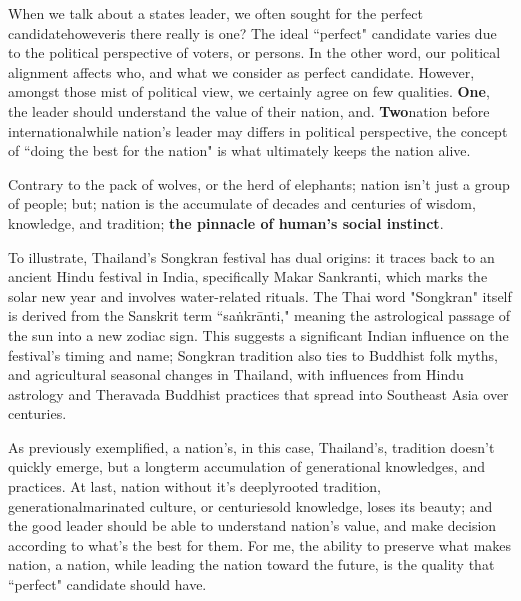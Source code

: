 \documentclass[11pt]{article}
\begin{document}
When we talk about a states leader, we often sought for the perfect candidate\textemdash however\textemdash is there really is one? The ideal ``perfect" candidate varies due to the political perspective of voters, or persons. In the other word, our political alignment affects who, and what we consider as perfect candidate. However, amongst those mist of political view, we certainly agree on few qualities. \textbf{One}, the leader should understand the value of their nation, and. \textbf{Two}\textemdash nation before international\textemdash while nation's leader may differs in political perspective, the concept of ``doing the best for the nation" is what ultimately keeps the nation alive.

Contrary to the pack of wolves, or the herd of elephants; nation isn't just a group of people; but; nation is the accumulate of decades and centuries of wisdom, knowledge, and tradition; \textbf{the pinnacle of human's social instinct}.

To illustrate, Thailand's Songkran festival has dual origins: it traces back to an ancient Hindu festival in India, specifically Makar Sankranti, which marks the solar new year and involves water-related rituals. The Thai word "Songkran" itself is derived from the Sanskrit term ``saṅkrānti," meaning the astrological passage of the sun into a new zodiac sign. This suggests a significant Indian influence on the festival's timing and name; Songkran tradition also ties to Buddhist folk myths, and agricultural seasonal changes in Thailand, with influences from Hindu astrology and Theravada Buddhist practices that spread into Southeast Asia over centuries. 

As previously exemplified, a nation's, in this case, Thailand's, tradition doesn't quickly emerge, but a long\textemdash term accumulation of generational knowledges, and practices. At last, nation without it's deeply\textendash rooted tradition, generational\textendash marinated culture, or centuries\textendash old knowledge, loses its beauty; and the  good leader should be able to understand nation's value, and make decision according to what's the best for them. For me, the ability to preserve what makes nation, a nation, while leading the nation toward the future, is the quality that ``perfect" candidate should have.
\end{document}
